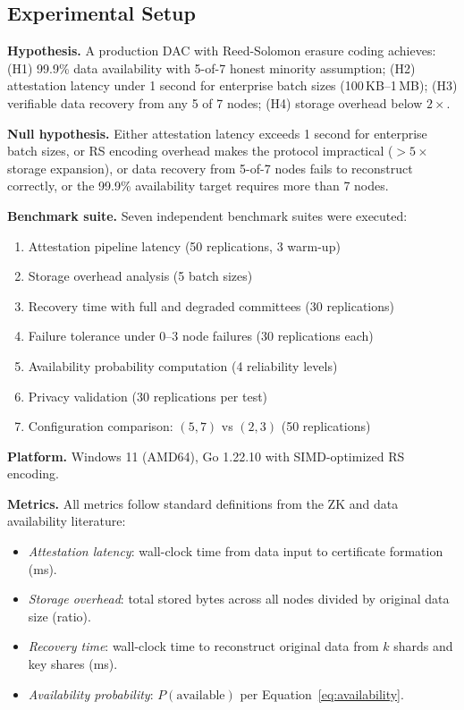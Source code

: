 \subsection{Experimental Setup}

\textbf{Hypothesis.}
A production DAC with Reed-Solomon erasure coding achieves: (H1) 99.9\%
data availability with 5-of-7 honest minority assumption; (H2)
attestation latency under 1 second for enterprise batch sizes
(100\,KB--1\,MB); (H3) verifiable data recovery from any 5 of 7 nodes;
(H4) storage overhead below $2\times$.

\textbf{Null hypothesis.}
Either attestation latency exceeds 1 second for enterprise batch sizes,
or RS encoding overhead makes the protocol impractical ($>5\times$
storage expansion), or data recovery from 5-of-7 nodes fails to
reconstruct correctly, or the 99.9\% availability target requires more
than 7 nodes.

\textbf{Benchmark suite.}
Seven independent benchmark suites were executed:
\begin{enumerate}
  \item Attestation pipeline latency (50 replications, 3 warm-up)
  \item Storage overhead analysis (5 batch sizes)
  \item Recovery time with full and degraded committees (30 replications)
  \item Failure tolerance under 0--3 node failures (30 replications each)
  \item Availability probability computation (4 reliability levels)
  \item Privacy validation (30 replications per test)
  \item Configuration comparison: $(5,7)$ vs $(2,3)$ (50 replications)
\end{enumerate}

\textbf{Platform.}
Windows 11 (AMD64), Go 1.22.10 with SIMD-optimized RS encoding.

\textbf{Metrics.}
All metrics follow standard definitions from the ZK and data availability
literature:
\begin{itemize}
  \item \textit{Attestation latency}: wall-clock time from data input to
    certificate formation (ms).
  \item \textit{Storage overhead}: total stored bytes across all nodes
    divided by original data size (ratio).
  \item \textit{Recovery time}: wall-clock time to reconstruct original
    data from $k$ shards and key shares (ms).
  \item \textit{Availability probability}: $P(\text{available})$ per
    Equation~\ref{eq:availability}.
\end{itemize}
